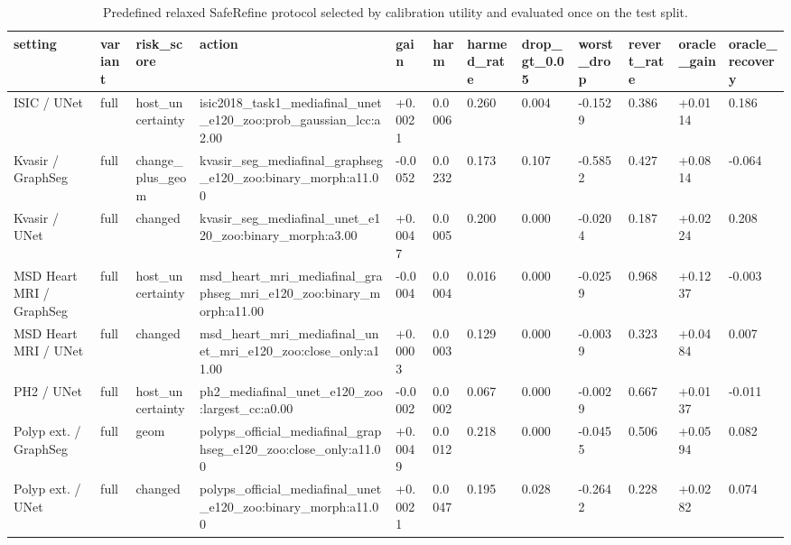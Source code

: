 \begin{table}[t]
\centering
\small
\caption{Predefined relaxed SafeRefine protocol selected by calibration utility and evaluated once on the test split.}
\label{tab:relaxed_saferefine_protocol}
\begin{tabular}{llllllllllll}
\toprule
setting & variant & risk\_score & action & gain & harm & harmed\_rate & drop\_gt\_0.05 & worst\_drop & revert\_rate & oracle\_gain & oracle\_recovery \\
\midrule
ISIC / UNet & full & host\_uncertainty & isic2018\_task1\_mediafinal\_unet\_e120\_zoo:prob\_gaussian\_lcc:a2.00 & +0.0021 & 0.0006 & 0.260 & 0.004 & -0.1529 & 0.386 & +0.0114 & 0.186 \\
Kvasir / GraphSeg & full & change\_plus\_geom & kvasir\_seg\_mediafinal\_graphseg\_e120\_zoo:binary\_morph:a11.00 & -0.0052 & 0.0232 & 0.173 & 0.107 & -0.5852 & 0.427 & +0.0814 & -0.064 \\
Kvasir / UNet & full & changed & kvasir\_seg\_mediafinal\_unet\_e120\_zoo:binary\_morph:a3.00 & +0.0047 & 0.0005 & 0.200 & 0.000 & -0.0204 & 0.187 & +0.0224 & 0.208 \\
MSD Heart MRI / GraphSeg & full & host\_uncertainty & msd\_heart\_mri\_mediafinal\_graphseg\_mri\_e120\_zoo:binary\_morph:a11.00 & -0.0004 & 0.0004 & 0.016 & 0.000 & -0.0259 & 0.968 & +0.1237 & -0.003 \\
MSD Heart MRI / UNet & full & changed & msd\_heart\_mri\_mediafinal\_unet\_mri\_e120\_zoo:close\_only:a11.00 & +0.0003 & 0.0003 & 0.129 & 0.000 & -0.0039 & 0.323 & +0.0484 & 0.007 \\
PH2 / UNet & full & host\_uncertainty & ph2\_mediafinal\_unet\_e120\_zoo:largest\_cc:a0.00 & -0.0002 & 0.0002 & 0.067 & 0.000 & -0.0029 & 0.667 & +0.0137 & -0.011 \\
Polyp ext. / GraphSeg & full & geom & polyps\_official\_mediafinal\_graphseg\_e120\_zoo:close\_only:a11.00 & +0.0049 & 0.0012 & 0.218 & 0.000 & -0.0455 & 0.506 & +0.0594 & 0.082 \\
Polyp ext. / UNet & full & changed & polyps\_official\_mediafinal\_unet\_e120\_zoo:binary\_morph:a11.00 & +0.0021 & 0.0047 & 0.195 & 0.028 & -0.2642 & 0.228 & +0.0282 & 0.074 \\
\bottomrule
\end{tabular}
\end{table}
